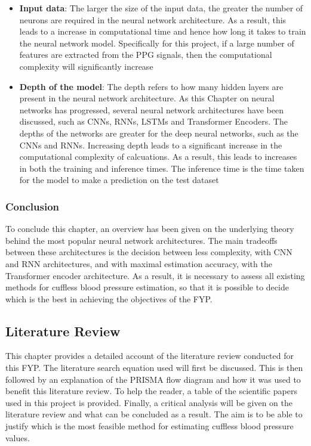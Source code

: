  \begin{itemize}
    \item \textbf{Input data}: The larger the size of the input data, the greater the number of neurons are required in the neural network architecture. As a result, this leads to a increase in computational time and hence how long it takes to train the neural network model. Specifically for this project, if a large number of features are extracted from the PPG signals, then the computational complexity will significantly increase 
    \item \textbf{Depth of the model}: The depth refers to how many hidden layers are present in the neural network architecture. As this Chapter on neural networks has progressed, several neural network architectures have been discussed, such as CNNs, RNNs, LSTMs and Transformer Encoders. The depths of the networks are greater for the deep neural networks, such as the CNNs and RNNs. Increasing depth leads to a significant increase in the computational complexity of calcuations. As a result, this leads to increases in both the training and inference times. The inference time is the time taken for the model to make a prediction on the test dataset
 \end{itemize}


\subsubsection{Conclusion}
To conclude this chapter, an overview has been given on the underlying theory behind 
the most popular neural network architectures. The main tradeoffs between these architectures 
is the decision between less complexity, with CNN and RNN architectures, and with maximal 
estimation accuracy, with the Transformer encoder architecture. As a result, it is necessary 
to assess all existing methods for cuffless blood pressure estimation, so that it is possible 
to decide which is the best in achieving the objectives of the FYP.

\subsection{Literature Review}
This chapter provides a detailed account of the literature review conducted for this FYP. 
The literature search equation used will first be discussed. This is then followed by an explanation of the PRISMA 
flow diagram and how it was used to benefit this literature review. To help the reader, 
a table of the scientific papers used in this project is provided. Finally, a critical analysis 
will be given on the literature review and what can be concluded as a result. The aim is to be 
able to justify which is the most feasible method for estimating cuffless blood pressure values.

